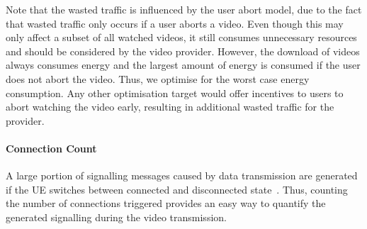Note that the wasted traffic \meanwastedtraffic is influenced by the user abort model, due to the fact that wasted traffic only occurs if a user aborts a video.
Even though this may only affect a subset of all watched videos, it still consumes unnecessary resources and should be considered by the video provider.
However, the download of videos always consumes energy and the largest amount of energy is consumed if the user does not abort the video.
Thus, we optimise for the worst case energy consumption.
Any other optimisation target would offer incentives to users to abort watching the video early, resulting in additional wasted traffic for the provider.

\paragraph*{Connection Count}
A large portion of signalling messages caused by data transmission are generated if the \gls{UE} switches between connected and disconnected state~\cite{3GPP_RRC_Spec}.
Thus, counting the number of connections \connectioncount triggered provides an easy way to quantify the generated signalling during the video transmission.
